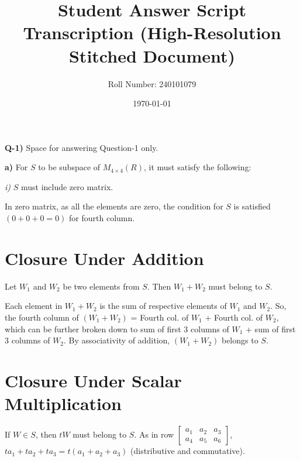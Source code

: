 \documentclass[12pt]{article}
\title{Student Answer Script Transcription (High-Resolution Stitched Document)}
\author{Roll Number: 240101079}
\date{\today}
\begin{document}
\maketitle

\textbf{Q-1)} Space for answering Question-1 only.

\textbf{a)} For $S$ to be subspace of $M_{4\times4}(R)$, it must satisfy the following:

\textit{i)} $S$ must include zero matrix.

In zero matrix, as all the elements are zero,
the condition for $S$ is satisfied $(0+0+0=0)$ for fourth column.

\section*{Closure Under Addition}

Let $W_{1}$ and $W_{2}$ be two elements from $S$. Then $W_{1} + W_{2}$ must belong to $S$.

Each element in $W_{1} + W_{2}$ is the sum of respective elements of $W_{1}$ and $W_{2}$. So, the fourth column of $(W_{1} + W_{2})$ = Fourth col. of $W_{1}$ + Fourth col. of $W_{2}$, which can be further broken down to sum of first 3 columns of $W_{1}$ + sum of first 3 columns of $W_{2}$. By associativity of addition, $(W_{1}+W_{2})$ belongs to $S$.

\section*{Closure Under Scalar Multiplication}

If $W \in S$, then $tW$ must belong to $S$. As in row $\left[\begin{array}{ccc}a_{1} & a_{2} & a_{3}\\a_{4} & a_{5} & a_{6}\end{array}\right]$, $ta_{1}+ta_{2}+ta_{3}=t(a_{1}+a_{2}+a_{3})$ (distributive and commutative).
\end{document}
